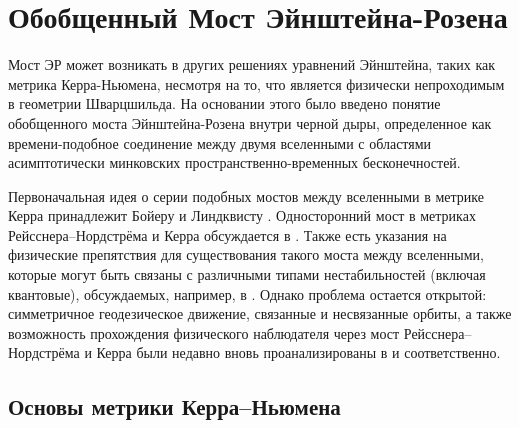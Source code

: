 \section{Обобщенный Мост Эйнштейна-Розена}\label{sec:2.2}

Мост ЭР может возникать в других решениях уравнений Эйнштейна, таких как метрика Керра-Ньюмена, несмотря на то, что является физически непроходимым в геометрии Шварцшильда. На основании этого было введено понятие обобщенного моста Эйнштейна-Розена внутри черной дыры, определенное как времени-подобное соединение между двумя вселенными с областями асимптотически минковских пространственно-временных бесконечностей.

Первоначальная идея о серии подобных мостов между вселенными в метрике Керра принадлежит Бойеру и Линдквисту \cite{boyer1967maximal}. Односторонний мост в метриках Рейсснера–Нордстрёма и Керра обсуждается в \cite{carrollSpacetimeGeometryIntroduction2014}. Также есть указания на физические препятствия для существования такого моста между вселенными, которые могут быть связаны с различными типами нестабильностей (включая квантовые), обсуждаемых, например, в \cite{gursel1979final, simpsonInternalInstabilityReissnerNordstrm1973}. Однако проблема остается открытой: симметричное геодезическое движение, связанные и несвязанные орбиты, а также возможность прохождения физического наблюдателя через мост Рейсснера–Нордстрёма и Керра были недавно вновь проанализированы в \cite{abramson2020momentum} и \cite{dyson2023kerr} соответственно.

\subsection{Основы метрики Керра–Ньюмена}\label{sub:2.2.1}

